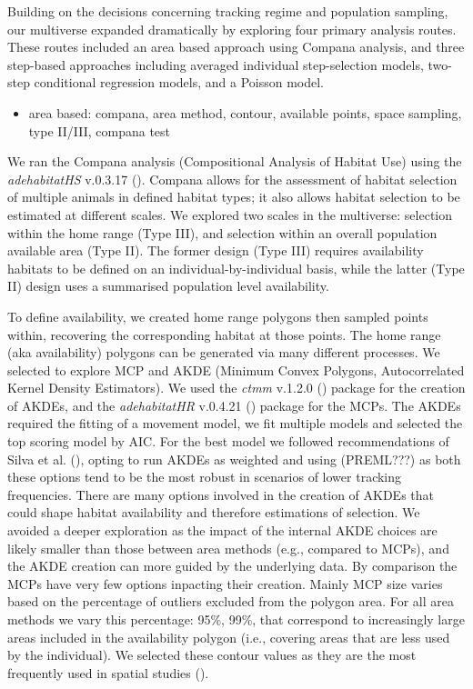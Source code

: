 \documentclass[10pt,a4paper]{article}
\providecommand{\tightlist}{%
  \setlength{\itemsep}{0pt}\setlength{\parskip}{0pt}}
\begin{document}
Building on the decisions concerning tracking regime and population sampling, our multiverse expanded dramatically by exploring four primary analysis routes.
These routes included an area based approach using Compana analysis, and three step-based approaches including averaged individual step-selection models, two-step conditional regression models, and a Poisson model.

\begin{itemize}
\tightlist
\item
  area based: compana, area method, contour, available points, space sampling, type II/III, compana test
\end{itemize}

We ran the Compana analysis (Compositional Analysis of Habitat Use) using the \emph{adehabitatHS} v.0.3.17 ().
Compana allows for the assessment of habitat selection of multiple animals in defined habitat types; it also allows habitat selection to be estimated at different scales.
We explored two scales in the multiverse: selection within the home range (Type III), and selection within an overall population available area (Type II).
The former design (Type III) requires availability habitats to be defined on an individual-by-individual basis, while the latter (Type II) design uses a summarised population level availability.

To define availability, we created home range polygons then sampled points within, recovering the corresponding habitat at those points.
The home range (aka availability) polygons can be generated via many different processes.
We selected to explore MCP and AKDE (Minimum Convex Polygons, Autocorrelated Kernel Density Estimators).
We used the \emph{ctmm} v.1.2.0 () package for the creation of AKDEs, and the \emph{adehabitatHR} v.0.4.21 () package for the MCPs.
The AKDEs required the fitting of a movement model, we fit multiple models and selected the top scoring model by AIC.
For the best model we followed recommendations of Silva et al. (), opting to run AKDEs as weighted and using (PREML???) as both these options tend to be the most robust in scenarios of lower tracking frequencies.
There are many options involved in the creation of AKDEs that could shape habitat availability and therefore estimations of selection.
We avoided a deeper exploration as the impact of the internal AKDE choices are likely smaller than those between area methods (e.g., compared to MCPs), and the AKDE creation can more guided by the underlying data.
By comparison the MCPs have very few options inpacting their creation.
Mainly MCP size varies based on the percentage of outliers excluded from the polygon area.
For all area methods we vary this percentage: 95\%, 99\%, that correspond to increasingly large areas included in the availability polygon (i.e., covering areas that are less used by the individual).
We selected these contour values as they are the most frequently used in spatial studies ().
\end{document}
